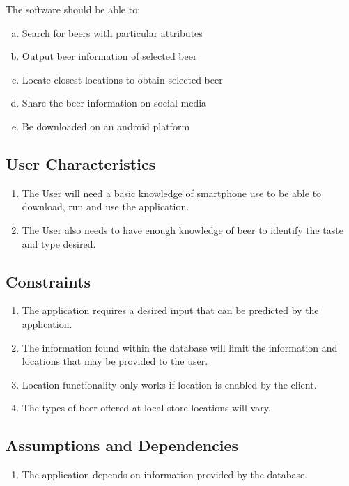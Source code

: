 \documentclass[]{article}
\begin{document}
The software should be able to:
\begin{enumerate}[a)]

\item Search for beers with particular attributes
\item Output beer information of selected beer
\item Locate closest locations to obtain selected beer
\item Share the beer information on social media 
\item Be downloaded on an android platform
	
	
\end{enumerate}

\subsection{User Characteristics}
\label{sub:user_characteristics}
\begin{enumerate}

	\item The User will need a basic knowledge of smartphone use to be able to download, run and use the application. 
	\item The User also needs to have enough knowledge of beer to identify the taste and type desired.

\end{enumerate}

\subsection{Constraints}
\label{sub:constraints}
\begin{enumerate}

	\item The application requires a desired input that can be predicted by the application.
	\item The information found within the database will limit the information and locations that may be provided to the user.
	\item Location functionality only works if location is enabled by the client.
	\item The types of beer offered at local store locations will vary.
	
\end{enumerate}

\subsection{Assumptions and Dependencies}
\label{sub:assumptions_and_dependencies}
\begin{enumerate}

\item The application depends on information provided by the database.


\end{enumerate}
\end{document}
